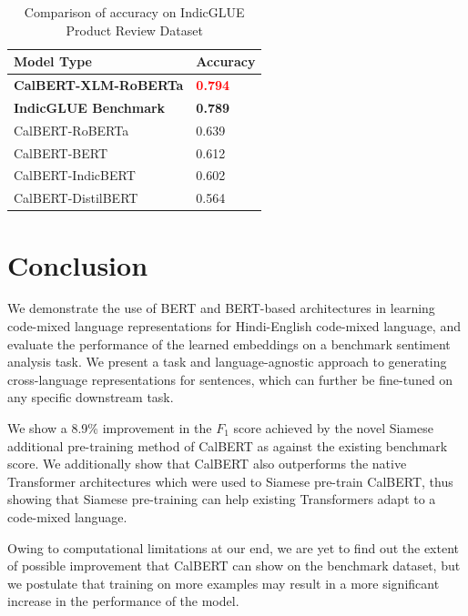 \documentclass[conference]{IEEEtran}
\begin{document}
\begin{table}[htbp]
\centering
\caption{Comparison of accuracy on IndicGLUE Product Review Dataset}
\label{tab:results_calbert_indicglue}
\begin{tabular}{|p{}|p{}|}
\hline
\textbf{Model Type} & \textbf{Accuracy}\\ 
\hline
\textbf{CalBERT-XLM-RoBERTa} & \textbf{\textcolor{red}{0.794}}\\ 
\hline
\textbf{IndicGLUE Benchmark} & \textbf{0.789} \\ \hline
CalBERT-RoBERTa & 0.639\\
\hline
CalBERT-BERT & 0.612 \\ 
\hline
CalBERT-IndicBERT & 0.602 \\
\hline
CalBERT-DistilBERT  & 0.564 \\
\hline
\end{tabular}
\end{table}

\section{Conclusion}
We demonstrate the use of BERT and BERT-based architectures in learning code-mixed language representations for Hindi-English code-mixed language, and evaluate the performance of the learned embeddings on a benchmark sentiment analysis task. We present a task and language-agnostic approach to generating cross-language representations for sentences, which can further be fine-tuned on any specific downstream task.

We show a 8.9\% improvement in the $F_1$ score achieved by the novel Siamese additional pre-training method of CalBERT as against the existing benchmark score. We additionally show that CalBERT also outperforms the native Transformer architectures which were used to Siamese pre-train CalBERT, thus showing that Siamese pre-training can help existing Transformers adapt to a code-mixed language.

Owing to computational limitations at our end, we are yet to find out the extent of possible improvement that CalBERT can show on the benchmark dataset, but we postulate that training on more examples may result in a more significant increase in the performance of the model.
\end{document}
